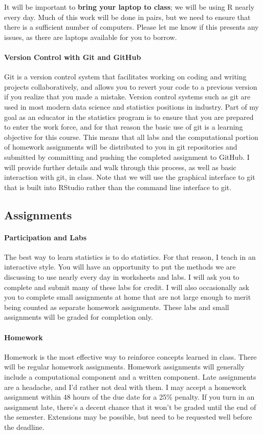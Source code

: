 \documentclass[11pt]{article}
\begin{document}
	It will be important to \textbf{bring your laptop to class}; we will be using R nearly every day.  Much of this work will be done in pairs, but we need to ensure that there is a sufficient number of computers.  Please let me know if this presents any issues, as there are laptops available for you to borrow.
	
	\paragraph{Version Control with Git and GitHub}
	
	Git is a version control system that facilitates working on coding and writing projects collaboratively, and allows you to revert your code to a previous version if you realize that you made a mistake.  Version control systems such as git are used in most modern data science and statistics positions in industry.  Part of my goal as an educator in the statistics program is to ensure that you are prepared to enter the work force, and for that reason the basic use of git is a learning objective for this course.  This means that all labs and the computational portion of homework assignments will be distributed to you in git repositories and submitted by committing and pushing the completed assignment to GitHub.  I will provide further details and walk through this process, as well as basic interaction with git, in class.  Note that we will use the graphical interface to git that is built into RStudio rather than the command line interface to git.
	
	\subsection*{Assignments}
	
	\paragraph{Participation and Labs}
	The best way to learn statistics is to do statistics.  For that reason, I teach in an interactive style.  You will have an opportunity to put the methods we are discussing to use nearly every day in worksheets and labs.  I will ask you to complete and submit many of these labs for credit.  I will also occasionally ask you to complete small assignments at home that are not large enough to merit being counted as separate homework assignments.  These labs and small assignments will be graded for completion only.
	
	\paragraph{Homework}
	Homework is the most effective way to reinforce concepts learned in class. There will be regular homework assignments. Homework assignments will generally include a computational component and a written component.  Late assignments are a headache, and I'd rather not deal with them. I may accept a homework assignment within 48 hours of the due date for a 25\% penalty. If you turn in an assignment late, there's a decent chance that it won't be graded until the end of the semester. Extensions may be possible, but need to be requested well before the deadline.
	
\end{document}
